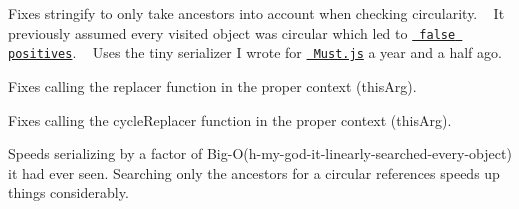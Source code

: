 
\begin{DoxyItemize}
\item Fixes stringify to only take ancestors into account when checking circularity. ~\newline
 It previously assumed every visited object was circular which led to \href{https://github.com/isaacs/json-stringify-safe/issues/9}{\texttt{ false positives}}. ~\newline
 Uses the tiny serializer I wrote for \href{https://github.com/moll/js-must}{\texttt{ Must.\+js}} a year and a half ago.
\item Fixes calling the {\ttfamily replacer} function in the proper context ({\ttfamily this\+Arg}).
\item Fixes calling the {\ttfamily cycle\+Replacer} function in the proper context ({\ttfamily this\+Arg}).
\item Speeds serializing by a factor of Big-\/O(h-\/my-\/god-\/it-\/linearly-\/searched-\/every-\/object) it had ever seen. Searching only the ancestors for a circular references speeds up things considerably. 
\end{DoxyItemize}